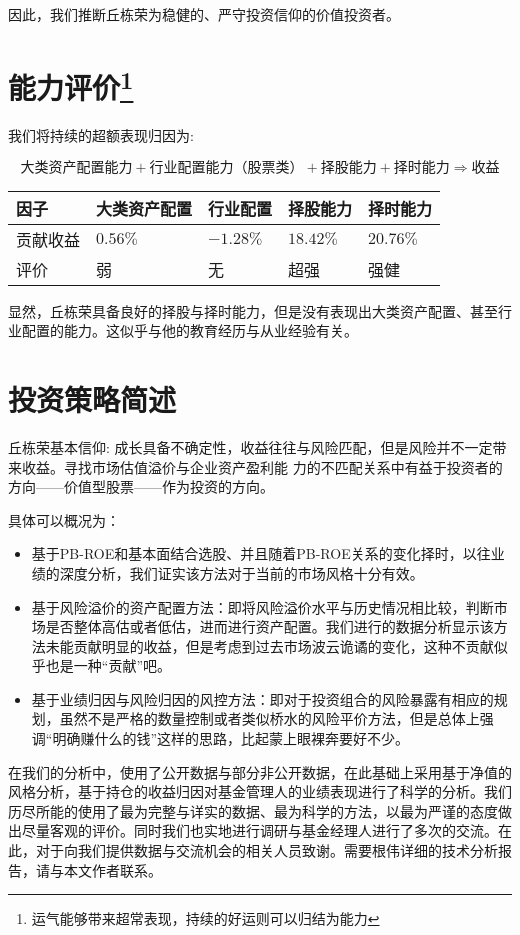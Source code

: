\documentclass[journal=jacsat,manuscript=article]{achemso}
\begin{document}
因此，我们推断丘栋荣为稳健的、严守投资信仰的价值投资者。

\section{\texorpdfstring{能力评价\footnote{运气能够带来超常表现，持续的好运则可以归结为能力}}{能力评价}}

我们将持续的超额表现归因为:

\begin{equation}
\mbox{大类资产配置能力} + \mbox{行业配置能力（股票类）}+ \mbox{择股能力} + \mbox{择时能力} \Rightarrow \mbox{收益} \nonumber
\end{equation}

\begin{table}
  \begin{tabular}{l|llll}
    因子 &大类资产配置  & 行业配置  & 择股能力 & 择时能力  \\ \hline
    贡献收益 & $0.56\%$   & $-1.28\%$ & $18.42\%$ &  $20.76\%$  \\
    评价 & 弱 & 无 & 超强 & 强健  \\ \hline
  \end{tabular}
\end{table}

显然，丘栋荣具备良好的择股与择时能力，但是没有表现出大类资产配置、甚至行业配置的能力。这似乎与他的教育经历与从业经验有关。

\section{投资策略简述}

丘栋荣基本信仰:
成长具备不确定性，收益往往与风险匹配，但是风险并不一定带来收益。寻找市场估值溢价与企业资产盈利能
力的不匹配关系中有益于投资者的方向------价值型股票------作为投资的方向。

具体可以概况为：

\begin{itemize}
\item 基于PB-ROE和基本面结合选股、并且随着PB-ROE关系的变化择时，以往业绩的深度分析，我们证实该方法对于当前的市场风格十分有效。
\item 基于风险溢价的资产配置方法：即将风险溢价水平与历史情况相比较，判断市场是否整体高估或者低估，进而进行资产配置。我们进行的数据分析显示该方法未能贡献明显的收益，但是考虑到过去市场波云诡谲的变化，这种不贡献似乎也是一种“贡献”吧。
\item 基于业绩归因与风险归因的风控方法：即对于投资组合的风险暴露有相应的规划，虽然不是严格的数量控制或者类似桥水的风险平价方法，但是总体上强调“明确赚什么的钱”这样的思路，比起蒙上眼裸奔要好不少。
\end{itemize}

\begin{acknowledgement}

在我们的分析中，使用了公开数据与部分非公开数据，在此基础上采用基于净值的风格分析，基于持仓的收益归因对基金管理人的业绩表现进行了科学的分析。我们历尽所能的使用了最为完整与详实的数据、最为科学的方法，以最为严谨的态度做出尽量客观的评价。同时我们也实地进行调研与基金经理人进行了多次的交流。在此，对于向我们提供数据与交流机会的相关人员致谢。需要根伟详细的技术分析报告，请与本文作者联系。

\end{acknowledgement}
\end{document}

